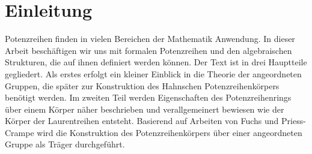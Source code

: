 \chapter{Einleitung}
%
Potenzreihen finden in vielen Bereichen der Mathematik Anwendung. In dieser Arbeit beschäftigen wir uns mit formalen Potenzreihen und den algebraischen Strukturen, die auf ihnen definiert werden können. Der Text ist in drei Hauptteile gegliedert. Als erstes erfolgt ein kleiner Einblick in die Theorie der angeordneten Gruppen, die später zur Konstruktion des Hahnschen Potenzreihenkörpers benötigt werden.  Im zweiten Teil werden Eigenschaften des  Potenzreihenrings über einem Körper näher beschrieben und verallgemeinert bewiesen wie der Körper der Laurentreihen entsteht. Basierend auf Arbeiten von Fuchs und Priess-Crampe wird die Konstruktion des Potenzreihenkörpers über einer angeordneten Gruppe als Träger durchgeführt.




%
%
%
